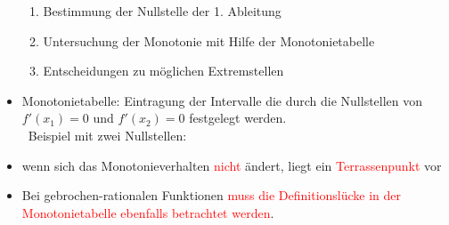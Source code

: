 \documentclass[a4paper,twocolumn,10pt]{onepgnote1}
\renewcommand\mynote{\notebox{Hinweis:}\ }
\begin{document}
\begin{itemize}
 \begin{enumerate}
     \item Bestimmung der Nullstelle der 1. Ableitung\\
     \item Untersuchung der Monotonie mit Hilfe der Monotonietabelle\\
     \item Entscheidungen zu möglichen Extremstellen
 \end{enumerate}
 \item Monotonietabelle: Eintragung der Intervalle die durch die Nullstellen von $f'(x_1)= 0$ und $f'(x_2)=0$ festgelegt werden.\\
\mynote Beispiel mit zwei Nullstellen:\\
\item wenn sich das Monotonieverhalten \textcolor{red}{nicht} ändert, liegt ein \textcolor{red}{Terrassenpunkt} vor 
\item Bei gebrochen-rationalen Funktionen \textcolor{red} {muss die Definitionslücke in der Monotonietabelle ebenfalls betrachtet werden}.
 \end{itemize}
\end{document}
